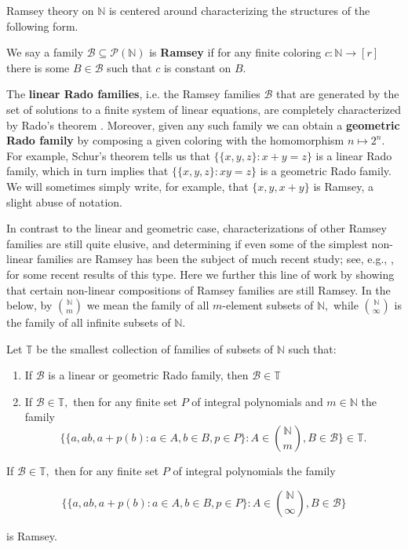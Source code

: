 \documentclass[tocmacros]{daj}
\begin{document}
Ramsey theory on $\mathbb{N}$ is centered around characterizing the structures of the following form.

\begin{definition}
\normalfont We say a family $\mathcal{B}\subseteq \mathcal{P}(\mathbb{N})$ is \textbf{Ramsey} if for any finite coloring $c:\mathbb{N}\rightarrow [r]$ there is some $B\in \mathcal{B}$ such that $c$ is constant on $B$. 
\end{definition}


The \textbf{linear Rado families}, i.e. the Ramsey families $\mathcal{B}$ that are generated by the set of solutions to a finite system of linear equations, are completely characterized by Rado's theorem \cite{rado1933studien}.  Moreover, given any such family we can obtain a \textbf{geometric Rado family} by composing a given coloring with the homomorphism $n\mapsto 2^n$. 
For example, Schur's theorem tells us that $\{\{x,y,z\}:x+y=z\}$ is a linear Rado family, which in turn implies that $\{\{x,y,z\}:xy=z\}$ is a geometric Rado family.  We will sometimes simply write, for example, that $\{x,y,x+y\}$ is Ramsey, a slight abuse of notation.

In contrast to the linear and geometric case, characterizations of other Ramsey families are still quite elusive, and determining if even some of the simplest non-linear families are Ramsey has been the subject of much recent study; see, e.g., \cite{alweiss2023monochromatic,alweiss2024monochromatic,chow2021rado,di2018ramsey,di2022monochromatic,moreira2017monochromatic,prendiville2021counting,sahasrabudhe2018exponential,sahasrabudhe2018monochromatic}, for some recent results of this type.  Here we further this line of work by showing that certain non-linear compositions of Ramsey families are still Ramsey.  In the below, by $\binom{\mathbb{N}}{m}$ we mean the family of all $m$-element subsets of $\mathbb{N},$ while $\binom{\mathbb{N}}{\infty}$ is the family of all infinite subsets of $\mathbb{N}.$

\begin{theorem}\label{thm:main}
Let $\mathbb{T}$ be the smallest collection of families of subsets of $\mathbb{N}$ such that:

\begin{enumerate}
    \item If $\mathcal{B}$ is a linear or geometric Rado family, then $\mathcal{B}\in\mathbb{T}$
    \item If $\mathcal{B}\in\mathbb{T},$ then for any finite set $P$ of integral polynomials and $m\in\mathbb{N}$ the family $$\{\{a,ab, a+p(b):a\in A, b\in B, p\in P\}: A\in \binom{\mathbb{N}}{m},B\in\mathcal{B}\}\in \mathbb{T}.$$
    
    \vspace{3mm}
    
\end{enumerate}

 If $\mathcal{B}\in \mathbb{T},$ then for any finite set $P$ of integral polynomials the family 

 $$\{\{a,ab, a+p(b):a\in A, b\in B, p\in P\}: A\in \binom{\mathbb{N}}{\infty},B\in\mathcal{B}\}$$

 is Ramsey.

\end{theorem}
\end{document}
